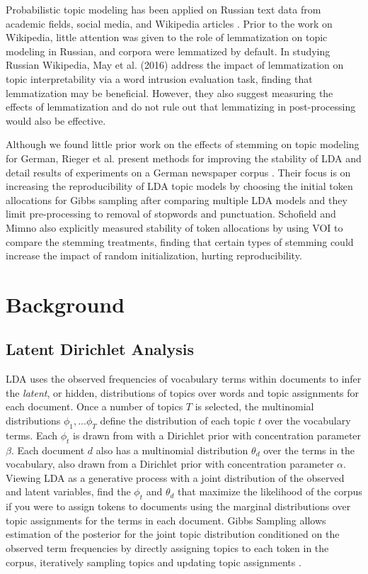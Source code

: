 \documentclass[11pt,a4paper]{article}
\begin{document}
Probabilistic topic modeling has been applied on Russian text data from academic fields, social media, and Wikipedia articles \cite{mitrofanova2015probabilistic,koltsova2013,May2016AnAO}. Prior to the work on Wikipedia, little attention was given to the role of lemmatization on topic modeling in Russian, and corpora were lemmatized by default. In studying Russian Wikipedia, May et al. (2016) address the impact of lemmatization on topic interpretability via a word intrusion evaluation task, finding that lemmatization may be beneficial. However, they also suggest measuring the effects of lemmatization and do not rule out that lemmatizing in post-processing would also be effective.

Although we found little prior work on the effects of stemming on topic modeling for German, Rieger et al. present methods for improving the stability of LDA and detail results of experiments on a German newspaper corpus \cite{Rieger2020ImprovingLD}. Their focus is on increasing the reproducibility of LDA topic models by choosing the initial token allocations for Gibbs sampling after comparing multiple LDA models and they limit pre-processing to removal of stopwords and punctuation. Schofield and Mimno also explicitly measured stability of token allocations by using VOI to compare the stemming treatments, finding that certain types of stemming could increase the impact of random initialization, hurting reproducibility.



\section{Background}

\subsection{Latent Dirichlet Analysis}
LDA uses the observed frequencies of vocabulary terms within documents to infer the \textit{latent}, or hidden, distributions of topics over words and topic assignments for each document. Once a number of topics $T$ is selected, the multinomial distributions $\phi_1,...\phi_T$ define the distribution of each topic $t$ over the vocabulary terms. Each $\phi_t$ is drawn from with a Dirichlet prior with concentration parameter $\beta$. Each document $d$ also has a multinomial distribution $\theta_d$ over the terms in the vocabulary, also drawn from a Dirichlet prior with concentration parameter $\alpha$. Viewing LDA as a generative process with a joint distribution of the observed and latent variables, find the $\phi_t$ and $\theta_d$ that maximize the likelihood of the corpus if you were to assign tokens to documents using the marginal distributions over topic assignments for the terms in each document. Gibbs Sampling allows estimation of the posterior for the joint topic distribution conditioned on the observed term frequencies by directly assigning topics to each token in the corpus, iteratively sampling topics and updating topic assignments
 \cite{steyvers2007probabilistic, blei2003,schofield-mimno-2016-comparing}.
\end{document}
